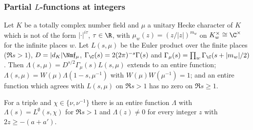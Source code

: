 \subsubsection{Partial $L$-functions at integers}\label{sec:pf:thmK:lint}

\begin{littheorem}\label{pf:thmK:heckefe}
Let $K$ be a totally complex number field and $\mu$ a unitary Hecke character of $K$ which is not of the form
$|\cdot|^{i\tau}$, $\tau\in\R$, with $\mu_w(z)=(z/|z|)^{m_w}$ on $K_w^\times\cong\C^\times$ for the infinite places $w$. Let
$L(s,\mu)$ be the Euler product over the finite places ($\Re s>1$), $D=|d_K|\Nm\mathfrak f_\mu$, $\Gamma_\C(s)=
2(2\pi)^{-s}\Gamma(s)$ and $\Gamma_\mu(s)=\prod_w\Gamma_\C(s+|m_w|/2)$. Then $\Lambda(s,\mu)=D^{s/2}\Gamma_\mu(s)L(s,\mu)$
extends to an entire function; $\Lambda(s,\mu)=W(\mu)\Lambda(1-s,\mu^{-1})$ with $W(\mu)W(\mu^{-1})=1$; and an entire
function which agrees with $L(s,\mu)$ on $\Re s>1$ has no zero on $\Re s\ge1$.
\end{littheorem}

\begin{lemma}\label{pf:thmK:lint}
For a triple and $\chi\in\{\nu,\nu^{-1}\}$ there is an entire function $\Lambda$ with $\Lambda(s)=L^{\emptyset}(s,\chi)$ for
$\Re s>1$ and $\Lambda(z)\ne0$ for every integer $z$ with $2z\ge-(a+a')$.
\end{lemma}

